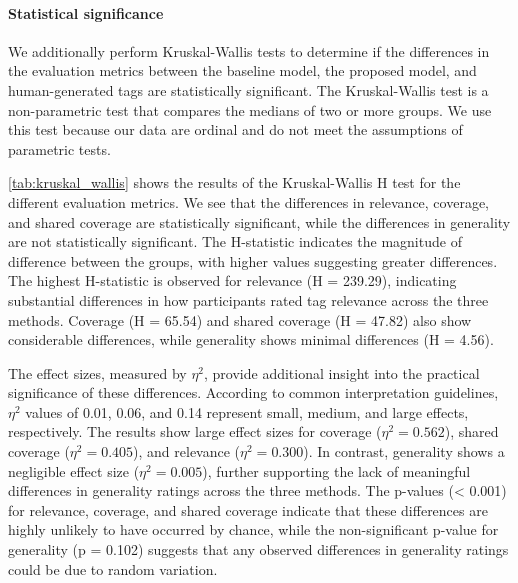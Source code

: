 \paragraph{Statistical significance}
We additionally perform Kruskal-Wallis tests to determine if the differences in the evaluation metrics between the baseline model, the proposed model, and human-generated tags are statistically significant. The Kruskal-Wallis test is a non-parametric test that compares the medians of two or more groups. We use this test because our data are ordinal and do not meet the assumptions of parametric tests.

\cref{tab:kruskal_wallis} shows the results of the Kruskal-Wallis H test for the different evaluation metrics. We see that the differences in relevance, coverage, and shared coverage are statistically significant, while the differences in generality are not statistically significant. The H-statistic indicates the magnitude of difference between the groups, with higher values suggesting greater differences. The highest H-statistic is observed for relevance (H = 239.29), indicating substantial differences in how participants rated tag relevance across the three methods. Coverage (H = 65.54) and shared coverage (H = 47.82) also show considerable differences, while generality shows minimal differences (H = 4.56).

The effect sizes, measured by $\eta^2$, provide additional insight into the practical significance of these differences. According to common interpretation guidelines, $\eta^2$ values of 0.01, 0.06, and 0.14 represent small, medium, and large effects, respectively. The results show large effect sizes for coverage ($\eta^2 = 0.562$), shared coverage ($\eta^2 = 0.405$), and relevance ($\eta^2 = 0.300$). In contrast, generality shows a negligible effect size ($\eta^2 = 0.005$), further supporting the lack of meaningful differences in generality ratings across the three methods. The p-values (< 0.001) for relevance, coverage, and shared coverage indicate that these differences are highly unlikely to have occurred by chance, while the non-significant p-value for generality (p = 0.102) suggests that any observed differences in generality ratings could be due to random variation.

